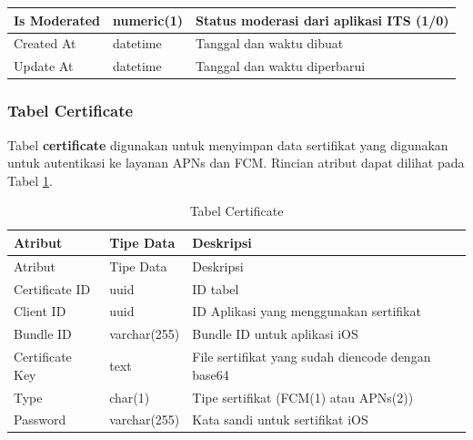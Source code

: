 \begin{longtable}{|p{2cm}|p{2.5cm}|p{4.5cm}|}
    Is Moderated & numeric(1) & Status moderasi dari aplikasi ITS (1/0) \\ \hline
    Created At & datetime & Tanggal dan waktu dibuat \\ \hline
    Update At & datetime & Tanggal dan waktu diperbarui \\ \hline
\end{longtable}

\subsubsection{Tabel Certificate}
\par Tabel \textbf{certificate} digunakan untuk menyimpan data sertifikat yang digunakan untuk autentikasi ke layanan APNs dan FCM. Rincian atribut dapat dilihat pada Tabel \ref{tabel_certificate}.
\begin{longtable}{|p{2cm}|p{2.5cm}|p{4.5cm}|}
	\caption{Tabel Certificate} \label{tabel_certificate} \\ \hline
    \rowcolor{lightgray} {Atribut} & {Tipe Data} & {Deskripsi} \\ \hline
    \endfirsthead
    \hline
    \rowcolor{lightgray} {Atribut} & {Tipe Data} & {Deskripsi} \\ \hline
    \endhead
    Certificate ID & uuid & ID tabel \\ \hline
    Client ID & uuid & ID Aplikasi yang menggunakan sertifikat \\ \hline
    Bundle ID & varchar(255) & Bundle ID untuk aplikasi iOS \\ \hline
    Certificate Key & text & File sertifikat yang sudah diencode dengan base64 \\ \hline
    Type & char(1) & Tipe sertifikat (FCM(1) atau APNs(2)) \\ \hline
    Password & varchar(255) & Kata sandi untuk sertifikat iOS \\ \hline
\end{longtable}

